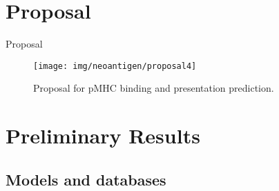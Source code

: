 \documentclass[10pt]{beamer}
\newcommand{\1}{
	\setbeamertemplate{background}{
		\texttt{[image: img/1]}
		\tikz[overlay] \fill[fill opacity=0.75,fill=white] (0,0) rectangle (-\paperwidth,\paperheight);
	}
}
\begin{document}
\section{Proposal}



\begin{frame}{Proposal}{}

	\vspace{0.5cm}
	\begin{figure}[H]
		\centering
		\texttt{[image: img/neoantigen/proposal4]}	
		\caption{Proposal for pMHC binding and presentation prediction.}
		\label{fig:neo_det_seq}
	\end{figure}
\end{frame}




\section{Preliminary Results}

\subsection{Models and databases}
\end{document}

